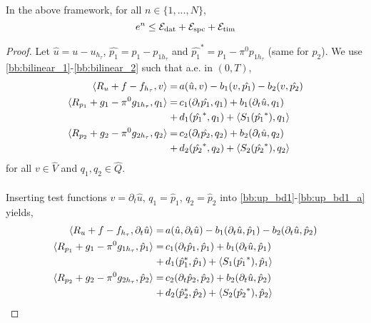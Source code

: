 \begin{proposition} \label{prop}
In the above framework, for all $n \in \{1,...,N \}$,
\begin{equation}
e^n \leq \mathcal{E}_{\textnormal{dat}} + \mathcal{E}_{\textnormal{spc}} + \mathcal{E}_{\textnormal{tim}} 
\end{equation}
\end{proposition}
\begin{proof}
Let $\hat{u}=u-u_{h_\tau}$, $\hat{p_1}=p_1-p_{1h_\tau}$ and $\hat{p_1}^*=p_1-\pi^0p_{1h_\tau}$ (same for $p_2$). We use \eqref{bb:bilinear_1}-\eqref{bb:bilinear_2} such that a.e. in $(0,T)$,
\begin{align}
\langle R_u + f - f_{h_\tau}, v \rangle  = & \, a(\hat{u}, v)-b_1(v, \hat{p_1})-b_2(v, \hat{p_2}) \label{bb:up_bd1}\\
\langle R_{p_1} + g_1 - \pi^0g_{1h_\tau}, q_1 \rangle = & \, c_1(\partial_t \hat{p_1}, q_1) + b_1(\partial_t \hat{u}, q_1) \\ 
+ & \, d_1(\hat{p_1}^*, q_1) + \langle S_1(\hat{p_1}^*), q_1 \rangle\notag \\
\langle R_{p_2} + g_2 - \pi^0g_{2h_\tau}, q_2 \rangle = & \, c_2(\partial_t \hat{p_2}, q_2) + b_2(\partial_t \hat{u}, q_2) \label{bb:up_bd1_a}\\
+ & \, d_2(\hat{p_2}^*, q_2) + \langle S_2(\hat{p_2}^*), q_2 \rangle \notag
\end{align}
for all $v \in \hat{V}$ and $q_1, q_2 \in \hat{Q}$.
\\
\\
Inserting test functions $v=\partial_t \hat{u}$, $q_1=\hat{p}_1$, $q_2=\hat{p}_2$ into \eqref{bb:up_bd1}-\eqref{bb:up_bd1_a} yields, 
\begin{align} \label{bb:up_bd2}
\langle R_u + f - f_{h_\tau}, \partial_t \hat{u} \rangle = & \, a(\hat{u}, \partial_t \hat{u}) - b_1(\partial_t \hat{u}, \hat{p}_1)- b_2(\partial_t \hat{u}, \hat{p}_2) \\ 
\langle R_{p_1} + g_1 - \pi^0g_{1h_\tau}, \hat{p}_1 \rangle = & \, c_1(\partial_t \hat{p}_1, \hat{p}_1) + b_1(\partial_t \hat{u}, \hat{p}_1) \\
+ & \, d_1(\hat{p}^*_1, \hat{p}_1) + \langle S_1(\hat{p_1}^*), \hat{p}_1 \rangle \notag \\
\langle R_{p_2} + g_2 - \pi^0g_{2h_\tau}, \hat{p}_2 \rangle = & \,c_2(\partial_t \hat{p}_2, \hat{p}_2) + b_2(\partial_t \hat{u}, \hat{p}_2) \label{bb:up_bd2_a}\\ 
+ & \, d_2(\hat{p}^*_2, \hat{p}_2) + \langle S_2(\hat{p_2}^*), \hat{p}_2 \rangle\notag

\end{align}
\end{proof}
